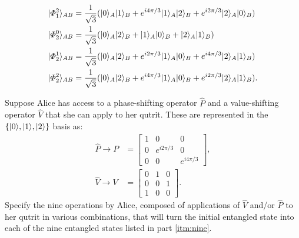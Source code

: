 \documentclass{../phys084}
\begin{document}
\begin {exercise}
\begin {problems}
\begin {align*}
      \lvert\Phi^2_1\rangle_{AB} &= \frac 1 {\sqrt 3}
      (\lvert0\rangle_A \lvert1\rangle_B + e^{i4\pi/3} \lvert1\rangle_A \lvert2\rangle_B + e^{i2\pi/3} \lvert2\rangle_A \lvert0\rangle_B) \\
      \lvert\Phi^0_2\rangle_{AB} &= \frac 1 {\sqrt 3}
      (\lvert0\rangle_A \lvert2\rangle_B + \lvert1\rangle_A \lvert0\rangle_B + \lvert2\rangle_A \lvert1\rangle_B) \\
      \lvert\Phi^1_2\rangle_{AB} &= \frac 1 {\sqrt 3}
      (\lvert0\rangle_A \lvert2\rangle_B + e^{i2\pi/3} \lvert1\rangle_A \lvert0\rangle_B + e^{i4\pi/3} \lvert2\rangle_A \lvert1\rangle_B) \\
      \lvert\Phi^2_2\rangle_{AB} &= \frac 1 {\sqrt 3}
      (\lvert0\rangle_A \lvert2\rangle_B + e^{i4\pi/3} \lvert1\rangle_A \lvert0\rangle_B + e^{i2\pi/3} \lvert2\rangle_A \lvert1\rangle_B).
    \end {align*}
  \item Suppose Alice has access to a phase-shifting operator
    \(\hat P\) and a value-shifting operator \(\hat V\) that she can
    apply to her qutrit.  These are represented in the
    \(\{\lvert0\rangle, \lvert1\rangle, \lvert2\rangle\}\) basis as:
    \begin {align*}
      \hat P \rightarrow P &=
      \begin {bmatrix}
        1 & 0 & 0 \\
        0 & e^{i2\pi/3} & 0 \\
        0 & 0 & e^{i4\pi/3}
      \end {bmatrix}, \\
      \hat V \rightarrow V &=
      \begin {bmatrix}
        0 & 1 & 0 \\
        0 & 0 & 1 \\
        1 & 0 & 0
      \end {bmatrix}.
    \end {align*}
    Specify the nine operations by Alice, composed of applications of
    \(\hat V\) and/or \(\hat P\) to her qutrit in various
    combinations, that will turn the initial entangled state into each
    of the nine entangled states listed in part \ref{itm:nine}.
  \end {problems}
\end {exercise}

\begin {solution}
  \begin {problems}
  \item
  \item
  \item
  \end {problems}
\end {solution}
\end{document}
